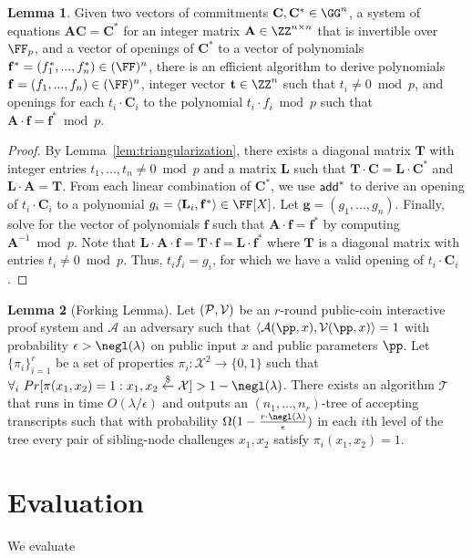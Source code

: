 \documentclass{article}
\theoremstyle{definition}
\newtheorem{lemma}{Lemma}
\begin{document}
\begin{lemma}\label{lem:extraction}
Given two vectors of commitments $\mathbf{C}, \mathbf{C^*} \in \G^n$, a system of equations $\mathbf{A} \mathbf{C} = \mathbf{C^*}$ for an integer matrix $\mathbf{A} \in \Z^{n \times n}$ that is invertible over $\F_p$, and a vector of openings of $\mathbf{C^*}$ to a vector of polynomials $\mathbf{f^*} = (f_1^*,...,f_n^*) \in (\FF)^n$, there is an efficient algorithm to derive polynomials $\mathbf{f} = (f_1,...,f_n) \in (\FF)^n$, integer vector $\mathbf{t} \in \Z^n$ such that $t_i \neq 0 \bmod p$, and openings for each $t_i \cdot \mathbf{C}_i$ to the polynomial $t_i \cdot f_i \bmod p$ such that $\mathbf{A} \cdot \mathbf{f} = \mathbf{f^*} \bmod p$. 
\end{lemma} 
\begin{proof} 
By Lemma~\ref{lem:triangularization}, there exists a diagonal matrix $\mathbf{T}$ with integer entries $t_1,...,t_n \neq 0 \bmod p$ and a matrix $\mathbf{L}$ such that $\mathbf{T} \cdot \mathbf{C} = \mathbf{L} \cdot \mathbf{C}^*$ and $\mathbf{L} \cdot \mathbf{A} = \mathbf{T}$. 
  From each linear combination of $\mathbf{C^*}$, we use $\textsf{add}^*$ to derive an opening of $t_i \cdot \mathbf{C}_i$ to a polynomial $g_i = \langle \mathbf{L}_i, \mathbf{f^*} \rangle \in \FX$.
   Let $\mathbf{g} = (g_1,...,g_n)$. Finally, solve for the vector of polynomials $\mathbf{f}$ such that $\mathbf{A} \cdot \mathbf{f} = \mathbf{f^*}$ by computing $\mathbf{A}^{-1} \bmod p$. Note that $\mathbf{L} \cdot \mathbf{A} \cdot \mathbf{f} = \mathbf{T} \cdot \mathbf{f} = \mathbf{L} \cdot \mathbf{f}^*$ where $\mathbf{T}$ is a diagonal matrix with entries $t_i \neq 0 \bmod p$. Thus, $t_i f_i = g_i$, for which we have a valid opening of $t_i \cdot \mathbf{C}_i$.   
\end{proof}

\begin{lemma}[Forking Lemma]\label{lem:forking}
Let $(\mathcal{P}, \mathcal{V})$ be an $r$-round public-coin interactive proof system and $\mathcal{A}$ an adversary such that $\langle \mathcal{A}(\pp, x), \verifier(\pp, x) \rangle = 1$ with probability $\epsilon > \negl(\lambda)$ on public input $x$ and public parameters $\pp$.  Let $\{\pi_i\}_{i =1}^r$ be a set of properties $\pi_i: \mathcal{X}^2 \rightarrow \{0,1\}$ such that $\forall_{i} \ Pr[ \pi(x_1, x_2) = 1: x_1, x_2 \sample \mathcal{X}] > 1 - \negl(\lambda)$. There exists an algorithm $\mathcal{T}$ that runs in time $O(\lambda/\epsilon)$ and outputs an $(n_1,...,n_r)$-tree of accepting transcripts such that with probability $\Omega(1 - \frac{r \cdot\negl(\lambda)}{\epsilon})$ in each $i$th level of the tree every pair of sibling-node challenges $x_1, x_2$ satisfy $\pi_i(x_1, x_2) = 1$. 
\end{lemma} 

\section{Evaluation}

We evaluate 
 
 
\end{document}
